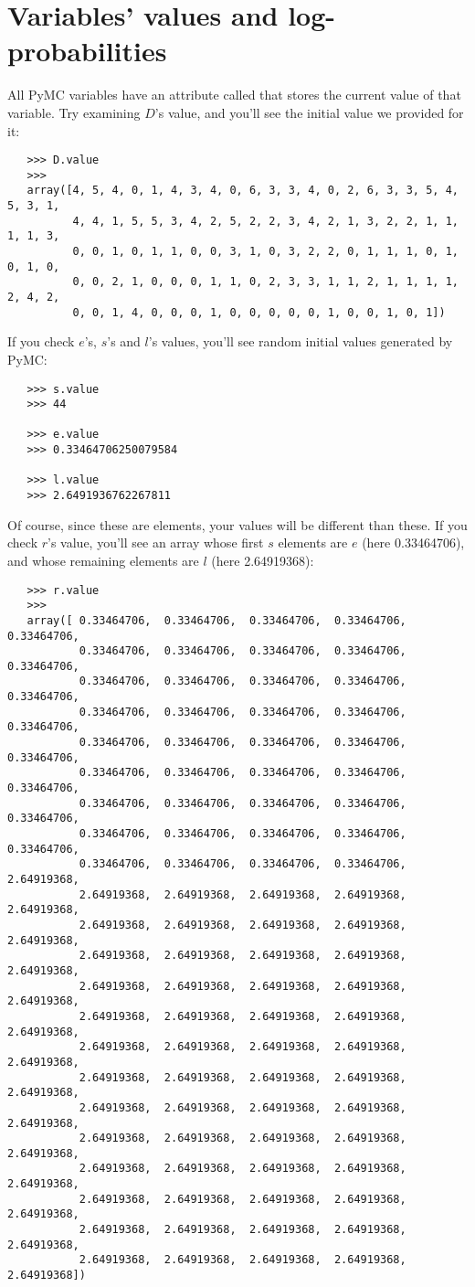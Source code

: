 \section{Variables' values and log-probabilities}
All PyMC variables have an attribute called  that stores the current value of that variable. Try examining $D$'s value, and you'll see the initial value we provided for it:
\begin{verbatim}
   >>> D.value
   >>>
   array([4, 5, 4, 0, 1, 4, 3, 4, 0, 6, 3, 3, 4, 0, 2, 6, 3, 3, 5, 4, 5, 3, 1,
          4, 4, 1, 5, 5, 3, 4, 2, 5, 2, 2, 3, 4, 2, 1, 3, 2, 2, 1, 1, 1, 1, 3,
          0, 0, 1, 0, 1, 1, 0, 0, 3, 1, 0, 3, 2, 2, 0, 1, 1, 1, 0, 1, 0, 1, 0,
          0, 0, 2, 1, 0, 0, 0, 1, 1, 0, 2, 3, 3, 1, 1, 2, 1, 1, 1, 1, 2, 4, 2,
          0, 0, 1, 4, 0, 0, 0, 1, 0, 0, 0, 0, 0, 1, 0, 0, 1, 0, 1])
\end{verbatim}
If you check $e$'s, $s$'s and $l$'s values, you'll see random initial values generated by PyMC:
\begin{verbatim}
   >>> s.value
   >>> 44

   >>> e.value
   >>> 0.33464706250079584

   >>> l.value
   >>> 2.6491936762267811
\end{verbatim}
Of course, since these are  elements, your values will be different than these. If you check $r$'s value, you'll see an array whose first $s$ elements are $e$ (here 0.33464706), and whose remaining elements are $l$ (here 2.64919368):
\begin{verbatim}
   >>> r.value
   >>>
   array([ 0.33464706,  0.33464706,  0.33464706,  0.33464706,  0.33464706,
           0.33464706,  0.33464706,  0.33464706,  0.33464706,  0.33464706,
           0.33464706,  0.33464706,  0.33464706,  0.33464706,  0.33464706,
           0.33464706,  0.33464706,  0.33464706,  0.33464706,  0.33464706,
           0.33464706,  0.33464706,  0.33464706,  0.33464706,  0.33464706,
           0.33464706,  0.33464706,  0.33464706,  0.33464706,  0.33464706,
           0.33464706,  0.33464706,  0.33464706,  0.33464706,  0.33464706,
           0.33464706,  0.33464706,  0.33464706,  0.33464706,  0.33464706,
           0.33464706,  0.33464706,  0.33464706,  0.33464706,  2.64919368,
           2.64919368,  2.64919368,  2.64919368,  2.64919368,  2.64919368,
           2.64919368,  2.64919368,  2.64919368,  2.64919368,  2.64919368,
           2.64919368,  2.64919368,  2.64919368,  2.64919368,  2.64919368,
           2.64919368,  2.64919368,  2.64919368,  2.64919368,  2.64919368,
           2.64919368,  2.64919368,  2.64919368,  2.64919368,  2.64919368,
           2.64919368,  2.64919368,  2.64919368,  2.64919368,  2.64919368,
           2.64919368,  2.64919368,  2.64919368,  2.64919368,  2.64919368,
           2.64919368,  2.64919368,  2.64919368,  2.64919368,  2.64919368,
           2.64919368,  2.64919368,  2.64919368,  2.64919368,  2.64919368,
           2.64919368,  2.64919368,  2.64919368,  2.64919368,  2.64919368,
           2.64919368,  2.64919368,  2.64919368,  2.64919368,  2.64919368,
           2.64919368,  2.64919368,  2.64919368,  2.64919368,  2.64919368,
           2.64919368,  2.64919368,  2.64919368,  2.64919368,  2.64919368])
\end{verbatim}
